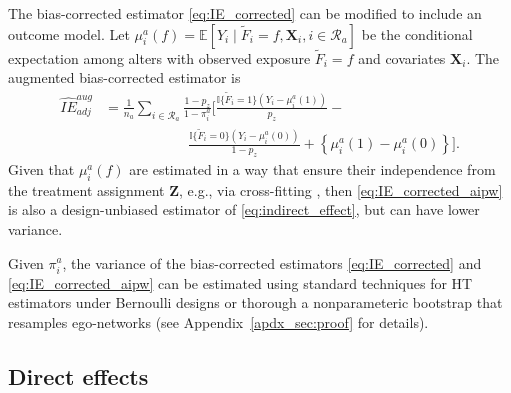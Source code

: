 \documentclass[11pt]{article}
\theoremstyle{definition}
\def \bZ {\boldsymbol{Z}}
\def \bX {\boldsymbol{X}}
\def \cR {\mathcal{R}}
\def \EX {\mathbb{E}}
\begin{document}
The bias-corrected estimator \eqref{eq:IE_corrected} can be modified to include an outcome model.
 Let $\mu^a_i(f) = \EX \left[Y_i \mid \widetilde{F}_i=f, \bX_i, i \in \cR_a \right]$
be the conditional expectation among alters with observed exposure $\widetilde{F}_i = f$ and covariates $\bX_i$.
The augmented bias-corrected estimator is
\begin{equation}
    \label{eq:IE_corrected_aipw}
    \begin{aligned}
    \widehat{IE}_{adj}^{aug} 
    &= 
    \frac{1}{n_a}
    \sum_{i \in \cR_a}
    \frac{1-p_z}{1-\pi_i^a}
    \Bigg[
    \frac{
    \mathbb{I}\{
    \widetilde{F}_i=1\}\left(Y_i - \mu^a_i(1) \right)}{p_z} -
    \\ &\qquad \qquad \qquad
    \frac{
    \mathbb{I}\{\widetilde{F}_i=0\}\left(Y_i - \mu^a_i(0) \right)}{1 - p_z} 
    + \left\{\mu^a_i(1) - \mu^a_i(0) \right\}
    \Bigg].
    \end{aligned}
\end{equation}
Given that $\mu^a_i(f)$ are estimated in a way that ensure their independence from the treatment assignment $\bZ$,
e.g., via cross-fitting \citep{Chernozhukov2018},
then \eqref{eq:IE_corrected_aipw} is also a design-unbiased estimator of \eqref{eq:indirect_effect}, but can have lower variance.

Given $\pi_i^a$, the variance of the bias-corrected estimators \eqref{eq:IE_corrected} and \eqref{eq:IE_corrected_aipw}
can be estimated using standard techniques for HT estimators under Bernoulli designs or 
thorough a nonparameteric bootstrap that resamples ego-networks (see Appendix~\ref{apdx_sec:proof} for details).

\subsection{Direct effects}
\label{subsec:de}
\end{document}
